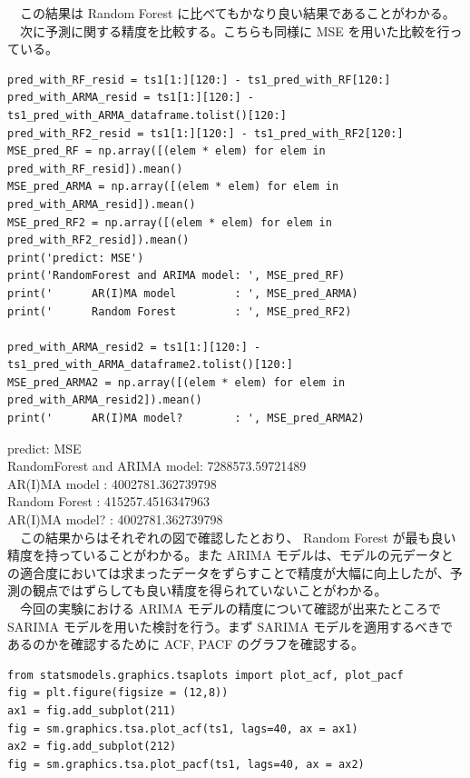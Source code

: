 \documentclass{scrartcl}
\begin{document}
　この結果は Random Forest に比べてもかなり良い結果であることがわかる。\\
　次に予測に関する精度を比較する。こちらも同様に MSE を用いた比較を行っている。\\
\begin{verbatim}
pred_with_RF_resid = ts1[1:][120:] - ts1_pred_with_RF[120:]
pred_with_ARMA_resid = ts1[1:][120:] - ts1_pred_with_ARMA_dataframe.tolist()[120:]
pred_with_RF2_resid = ts1[1:][120:] - ts1_pred_with_RF2[120:]
MSE_pred_RF = np.array([(elem * elem) for elem in pred_with_RF_resid]).mean()
MSE_pred_ARMA = np.array([(elem * elem) for elem in pred_with_ARMA_resid]).mean()
MSE_pred_RF2 = np.array([(elem * elem) for elem in pred_with_RF2_resid]).mean()
print('predict: MSE')
print('RandomForest and ARIMA model: ', MSE_pred_RF)
print('      AR(I)MA model         : ', MSE_pred_ARMA)
print('      Random Forest         : ', MSE_pred_RF2)

pred_with_ARMA_resid2 = ts1[1:][120:] - ts1_pred_with_ARMA_dataframe2.tolist()[120:]
MSE_pred_ARMA2 = np.array([(elem * elem) for elem in pred_with_ARMA_resid2]).mean()
print('      AR(I)MA model?        : ', MSE_pred_ARMA2)
\end{verbatim}

predict: MSE\\
RandomForest and ARIMA model:  7288573.59721489\\
      AR(I)MA model         :  4002781.362739798\\
      Random Forest         :  415257.4516347963\\
      AR(I)MA model?        :  4002781.362739798\\

　この結果からはそれぞれの図で確認したとおり、 Random Forest が最も良い精度を持っていることがわかる。また ARIMA モデルは、モデルの元データとの適合度においては求まったデータをずらすことで精度が大幅に向上したが、予測の観点ではずらしても良い精度を得られていないことがわかる。\\

　今回の実験における ARIMA モデルの精度について確認が出来たところで SARIMA モデルを用いた検討を行う。まず SARIMA モデルを適用するべきであるのかを確認するために ACF, PACF のグラフを確認する。\\

\begin{verbatim}
from statsmodels.graphics.tsaplots import plot_acf, plot_pacf
fig = plt.figure(figsize = (12,8))
ax1 = fig.add_subplot(211)
fig = sm.graphics.tsa.plot_acf(ts1, lags=40, ax = ax1)
ax2 = fig.add_subplot(212)
fig = sm.graphics.tsa.plot_pacf(ts1, lags=40, ax = ax2)
\end{verbatim}
\end{document}

